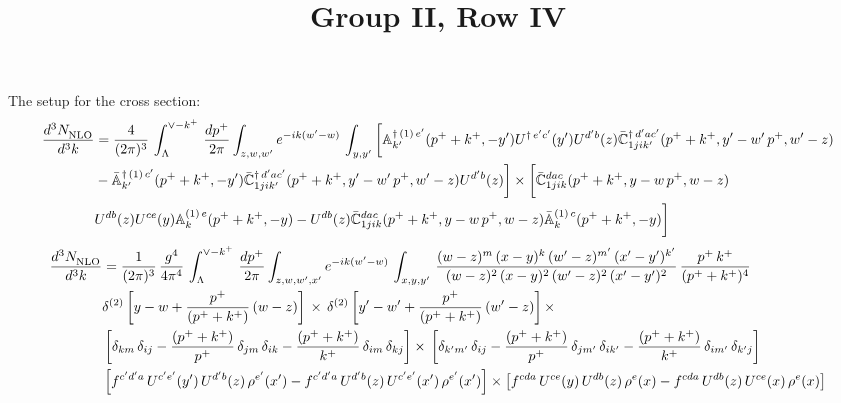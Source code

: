 \documentclass[9pt]{article}
\title{Group II, Row IV}
\author{}
\date{}
\def\mf#1{\mathbb{#1}}
\numberwithin{equation}{section}
\begin{document}
\maketitle
The setup for the cross section: 
\begin{align}
    \frac{d^{3}N_{\rm NLO}^{\rm}}{d^{3}k}  & = \frac{4}{(2\pi)^{3}}\,\int_{\Lambda}^{\vee-k^{+}}\, \frac{dp^{+}}{2\pi}\int_{z,w,w^{\prime}} e^{-ik(w^{\prime}-w)}\,  \int_{y,y^{\prime}}\bigg[\mf{A}^{\dagger\, (1)\,e^{\prime}}_{k^{\prime}}(p^{+}+k^{+},-y^{\prime})U^{\dagger\, e^{\prime}c^{\prime}}(y^{\prime})U^{d^{\prime}b}(z) \Bar{\mf{C}}^{\dagger\, d^{\prime}ac^{\prime}}_{1jik^{\prime}}(p^{+}+k^{+},y^{\prime}-w^{\prime}\, p^{+},w^{\prime}-z) \notag \\ &  -\Bar{\mf{A}}^{\dagger\, (1)\,c^{\prime}}_{k^{\prime}}(p^{+}+k^{+},-y^{\prime}) \Bar{\mf{C}}^{\dagger\, d^{\prime}ac^{\prime}}_{1jik^{\prime}}(p^{+}+k^{+},y^{\prime}-w^{\prime}\, p^{+},w^{\prime}-z)U^{d^{\prime}b}(z)\bigg]\times\bigg[\Bar{\mf{C}}^{dac}_{1jik}(p^{+}+k^{+},y-w\, p^{+},w-z)\notag \\ & U^{db}(z)U^{ce}(y) \mf{A}^{(1)\,e}_{k}(p^{+}+k^{+},-y) -U^{db}(z) \Bar{\mf{C}}^{dac}_{1jik}(p^{+}+k^{+},y-w\, p^{+},w-z)\Bar{\mf{A}}^{(1)\,c}_{k}(p^{+}+k^{+},-y)\bigg]\nonumber
\end{align}
\begin{align}
     \frac{d^{3}N_{\rm NLO}^{\rm}}{d^{3}k}  & = \frac{1}{(2\pi)^{3}}\,\frac{g^{4}}{4\pi^{4}}\,\int_{\Lambda}^{\vee-k^{+}}\, \frac{dp^{+}}{2\pi}\int_{z,w,w^{\prime},x'} e^{-ik(w^{\prime}-w)}\,  \int_{x,y,y^{\prime}}\,\frac{(w-z)^{m}\,(x-y)^{k}\,(w'-z)^{m'}\,(x'-y')^{k'}}{(w-z)^{2}\,(x-y)^{2}\,(w'-z)^{2}\,(x'-y')^{2}}\,\frac{p^{+}\,k^{+}}{(p^{+}+k^{+})^{4}}\notag \\ & \delta^{(2)}\left[y-w+\frac{p^{+}}{(p^{+}+k^{+})}\,(w-z)\right]\,\times\, \delta^{(2)}\left[y'-w'+\frac{p^{+}}{(p^{+}+k^{+})}\,(w'-z)\right]\times\notag \\ &  \left[\delta_{km}\,\delta_{ij}-\frac{(p^{+}+k^{+})}{p^{+}}\,\delta_{jm}\,\delta_{ik}-\frac{(p^{+}+k^{+})}{k^{+}}\,\delta_{im}\,\delta_{kj}\right]\times\, \left[\delta_{k'm'}\,\delta_{ij}-\frac{(p^{+}+k^{+})}{p^{+}}\,\delta_{jm'}\,\delta_{ik'}-\frac{(p^{+}+k^{+})}{k^{+}}\,\delta_{im'}\,\delta_{k'j}\right]\notag \\ & \left[f^{c'd'a}\,U^{c'e'}(y')\,U^{d'b}(z)\,\rho^{e'}(x')-f^{c'd'a}\, 
    U^{d'b}(z)\,U^{c'e'}(x')\,\rho^{e'}(x')\right]\times \left[f^{cda}\,U^{ce}(y)\,U^{db}(z)\,\rho^{e}(x)-f^{cda}\, 
    U^{db}(z)\,U^{ce}(x)\,\rho^{e}(x)\right]
\end{align}
\end{document}
